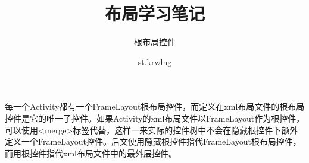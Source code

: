 \documentclass[UTF8]{ctexart}
\title{布局学习笔记}
\author{st.krwlng}
\begin{document}
    \subtitle{根布局控件}
    每一个Activity都有一个FrameLayout根布局控件，而定义在xml布局文件的根布局控件是它的唯一子控件。如果Activity的xml布局文件以FrameLayout作为根控件，可以使用<merge>标签代替，这样一来实际的控件树中不会在隐藏根控件下额外定义一个FrameLayout控件。后文使用隐藏根控件指代FrameLayout根布局控件，而用根控件指代xml布局文件中的最外层控件。
\end{document}

